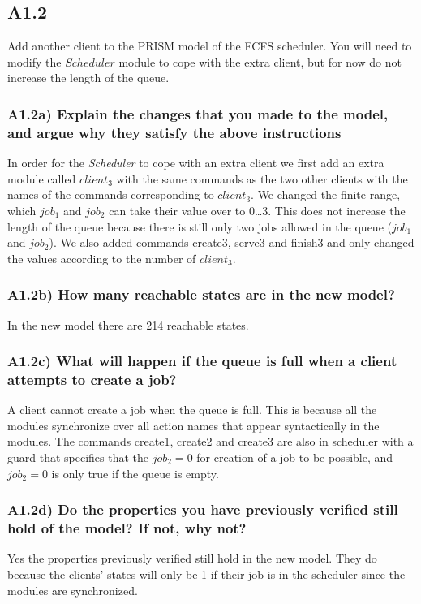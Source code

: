 \documentclass[12pt]{report}
\begin{document}
\subsection*{A1.2}
Add another client to the PRISM model of the FCFS scheduler. You will need to modify the $Scheduler$ module to cope with the extra client, but for now do not increase the length of the queue.

\subsubsection*{A1.2a) Explain the changes that you made to the model, and argue why they satisfy the above instructions}
In order for the \emph{Scheduler} to cope with an extra client we first add an extra module called $client_3$ with the same commands as the two other clients with the names of the commands corresponding to $client_3$. We changed the finite range, which $job_1$ and $job_2$ can take their value over to 0\dots3. This does not increase the length of the queue because there is still only two jobs allowed in the queue ($job_1$ and $job_2$). We also added commands create3, serve3 and finish3 and only changed the values according to the number of $client_3$.

\subsubsection*{A1.2b) How many reachable states are in the new model?}
In the new model there are 214 reachable states.

\subsubsection*{A1.2c) What will happen if the queue is full when a client attempts to create a job?}
A client cannot create a job when the queue is full. This is because all the modules synchronize over all action names that appear syntactically in the modules. The commands create1, create2 and create3 are also in scheduler with a guard that specifies that the $job_2 = 0$ for creation of a job to be possible, and $job_2 = 0$ is only true if the queue is empty.

\subsubsection*{A1.2d) Do the properties you have previously verified still hold of the model? If not, why not?}
Yes the properties previously verified still hold in the new model. They do because the clients' states will only be 1 if their job is in the scheduler since the modules are synchronized.
\end{document}
